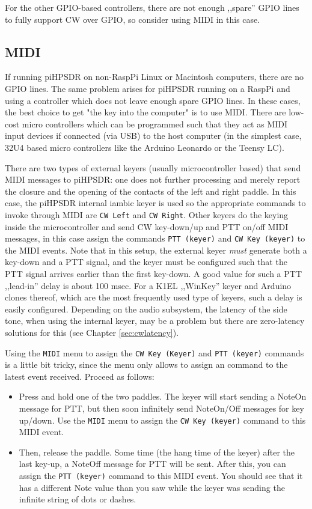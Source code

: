 \documentclass[12pt]{book}
\def\bltt#1{\texttt{\color{blue}#1}}
\def\pH{pi\-HPSDR\xspace}
\begin{document}
For the other GPIO-based controllers, there are not enough ,,spare'' GPIO lines to fully
support CW over GPIO, so consider using MIDI in this case.

\subsection{MIDI}

If running \pH on non-RaspPi Linux or Macintosh computers, there are no GPIO
lines. The same problem arises for \pH running on a RaspPi and using a controller
which does not leave enough spare GPIO lines. In these cases, the best
choice to get "the key into the computer" is to use MIDI. There are low-cost
micro controllers which can be programmed such that they act as MIDI input devices
if connected (via USB) to the host computer (in the simplest case, 32U4 based
micro controllers like the Arduino Leonardo or the Teensy LC).

There are two types of external keyers (usually microcontroller based) that send MIDI
messages to \pH: one does not further processing and merely report the closure and the opening
of the contacts of the left and right paddle. In this case, the \pH
internal iambic keyer is used so the appropriate commands to invoke through MIDI
are  \bltt{CW Left} and \bltt{CW Right}. Other keyers do the keying inside the microcontroller
and send CW key-down/up and PTT on/off MIDI messages, in this case assign the
commands  \bltt{PTT (keyer)} and
\bltt{CW Key (keyer)} to the MIDI events. Note that in this setup,
the external keyer \textit{must} generate both a key-down and a PTT signal, and the
keyer must be configured
such that the PTT signal arrives earlier than the first key-down. A good value for
such a PTT ,,lead-in'' delay is about 100 msec.
For a K1EL ,,WinKey'' keyer and Arduino clones thereof, which are the most frequently
used type of keyers, such a delay is easily configured. Depending on the audio subsystem,
the latency of the side tone, when using the internal keyer, may be a problem
but there are zero-latency solutions for this (see Chapter \ref{sec:cwlatency}).

Using the \bltt{MIDI} menu to assign the \bltt{CW Key (Keyer)} and \bltt{PTT (keyer)}
commands is a little bit tricky, since the menu only allows to assign an command to
the latest event received. Proceed as follows:

\begin{itemize}
\item{Press and hold one of the two paddles. The keyer will start sending a NoteOn
message for PTT, but then soon infinitely send NoteOn/Off messages for key up/down.
Use the \bltt{MIDI} menu to assign the \bltt{CW Key (keyer)} command to this MIDI event.}
\item{Then, release the paddle. Some time (the hang time of the keyer) after the last
key-up, a NoteOff message for PTT will be sent. After this, you can assign the
\bltt{PTT (keyer)} command to this MIDI event. You should see that it has a different
Note value than you saw while the keyer was sending the infinite string of dots or
dashes.}
\end{itemize}
\end{document}
